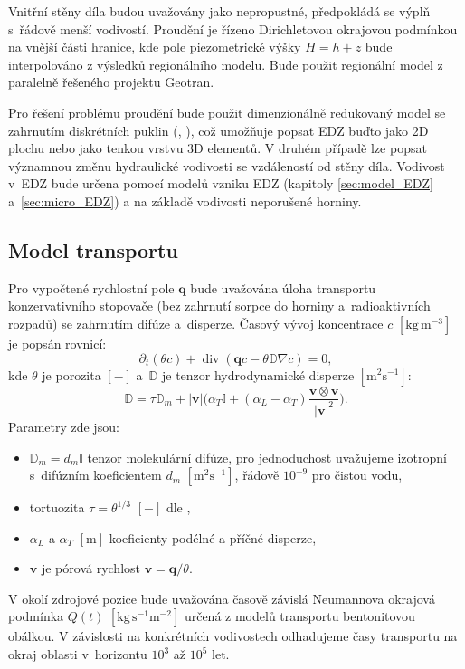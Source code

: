 \documentclass{article}
\def\abs#1{\lvert#1\rvert}
\def\prtl{\partial}
\def\unit#1{\mathrm{#1}}
\def\grad{\nabla}
\def\div{\operatorname{div}}
\def\vc#1{\mathbf{\boldsymbol{#1}}}     %
\def\tn#1{{\mathbb{#1}}}    %
\begin{document}
Vnitřní stěny díla budou uvažovány jako nepropustné, předpokládá se výplň s~řádově menší vodivostí. 
Proudění je řízeno Dirichletovou okrajovou podmínkou na vnější části hranice, kde pole piezometrické výšky $H = h + z$ 
bude interpolováno z výsledků regionálního modelu. Bude použit regionální model z paralelně řešeného projektu Geotran.

Pro řešení problému proudění bude použit dimenzionálně redukovaný model se zahrnutím diskrétních puklin (\cite{brezina_analysis_2015}, \cite{flow123d}),
což umožňuje popsat EDZ buďto jako 2D plochu nebo jako tenkou vrstvu 3D elementů.
V druhém případě lze popsat významnou změnu hydraulické vodivosti se vzdáleností od stěny díla.
Vodivost v~EDZ bude určena pomocí modelů vzniku EDZ (kapitoly \ref{sec:model_EDZ} a~\ref{sec:micro_EDZ}) 
a na základě vodivosti neporušené horniny.



\subsection{Model transportu}
\label{sec:stopovac}
Pro vypočtené rychlostní pole $\vc q$ bude uvažována úloha transportu konzervativního stopovače (bez zahrnutí sorpce do horniny a~radioaktivních rozpadů) 
se zahrnutím difúze a~disperze. Časový vývoj koncentrace $c$ $[\unit{kg\, m^{-3}}]$ je popsán rovnicí:
\[
   \prtl_t (\theta c) + \div( \vc q c - \theta \tn D \grad c) = 0,
\]
kde $\theta$ je porozita $[-]$ a~$\tn D$ je tenzor hydrodynamické disperze $[\unit{m^2s^{-1}}]$:
\[
  \tn D = \tau\tn D_m + \abs{\vc v}\Big(\alpha_T \tn I + (\alpha_L - \alpha_T)\frac{\vc v \otimes \vc v}{\abs{\vc v}^2}\Big).
\]
Parametry zde jsou:
\begin{itemize}
 \item $\tn D_m = d_m \tn I$ tenzor molekulární difúze, pro jednoduchost uvažujeme izotropní s~difúzním koeficientem $d_m$ $[\unit{m^2s^{-1}}]$, řádově $10^{-9}$ pro čistou vodu,
 \item tortuozita $\tau=\theta^{1/3}$ $[-]$ dle \cite{millington_quirk},
 \item $\alpha_L$ a $\alpha_T$ $[\unit{m}]$ koeficienty podélné a příčné disperze,
 \item $\vc v$ je pórová rychlost $\vc v = \vc q / \theta$.
\end{itemize}

V okolí zdrojové pozice bude uvažována časově závislá Neumannova okrajová podmínka $Q(t)$ $[\unit{kg\, s^{-1}m^{-2}}]$
určená z modelů transportu bentonitovou obálkou. V závislosti na konkrétních vodivostech odhadujeme časy 
transportu na okraj oblasti v~horizontu $10^3$ až $10^5$ let. 
\end{document}
